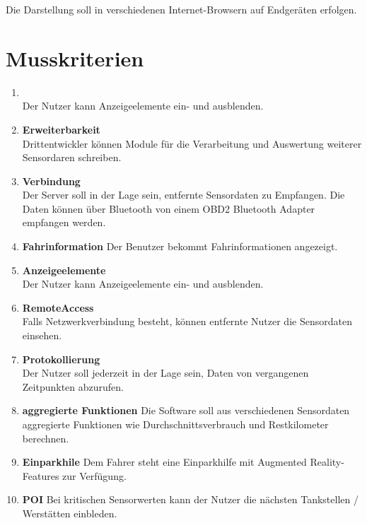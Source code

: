 \documentclass[pflichtenheft.tex]{subfiles}
\begin{document}
Die Darstellung soll in verschiedenen Internet-Browsern auf Endgeräten erfolgen. 

\section{Musskriterien}

\renewcommand{\theenumi}{/MK\ifnum \value{enumi}<10 0\fi\arabic{enumi}0/}
\renewcommand{\labelenumi}{\theenumi}
\renewcommand{\theenumii}{\arabic{enumii}}
\renewcommand{\labelenumii}{/MK\ifnum \value{enumi}<10 0\fi\arabic{enumi}\arabic{enumii}/}

\begin{enumerate}

\item{\textbf{}} \\Der Nutzer kann Anzeigeelemente ein- und ausblenden.



\item{\textbf{Erweiterbarkeit}} \\Drittentwickler können Module für die Verarbeitung und Auswertung weiterer Sensordaren schreiben.

\item{\textbf{Verbindung}} \\Der Server soll in der Lage sein, entfernte Sensordaten zu Empfangen. Die Daten können über Bluetooth von einem OBD2 Bluetooth Adapter empfangen werden.



\item{\textbf{Fahrinformation}} Der Benutzer bekommt Fahrinformationen angezeigt.
\item{\textbf{Anzeigeelemente}} \\Der Nutzer kann Anzeigeelemente ein- und ausblenden.

\item{\textbf{RemoteAccess}} \\Falls Netzwerkverbindung besteht, können entfernte Nutzer die Sensordaten einsehen.

\item{\textbf{Protokollierung}} \\Der Nutzer soll jederzeit in der Lage sein, Daten von vergangenen Zeitpunkten abzurufen.

\item{\textbf{aggregierte Funktionen}} Die Software soll aus verschiedenen Sensordaten aggregierte Funktionen wie Durchschnittsverbrauch und Restkilometer berechnen.

\item{\textbf{Einparkhile}} Dem Fahrer steht eine Einparkhilfe mit Augmented Reality-Features zur Verfügung.

\item{\textbf{POI}} Bei kritischen Sensorwerten kann der Nutzer die nächsten Tankstellen / Werstätten einbleden.
\end{enumerate}
\end{document}
